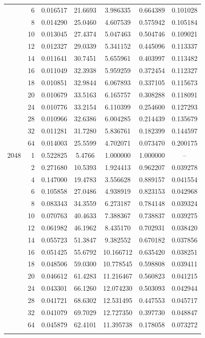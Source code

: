 \begin{longtable}{rrccccc}
 & 6 & 0.016517 & 21.6693 & 3.986335 & 0.664389 & 0.101028 \\
 & 8 & 0.014290 & 25.0460 & 4.607539 & 0.575942 & 0.105184 \\
 & 10 & 0.013045 & 27.4374 & 5.047463 & 0.504746 & 0.109021 \\
 & 12 & 0.012327 & 29.0339 & 5.341152 & 0.445096 & 0.113337 \\
 & 14 & 0.011641 & 30.7451 & 5.655961 & 0.403997 & 0.113482 \\
 & 16 & 0.011049 & 32.3938 & 5.959259 & 0.372454 & 0.112327 \\
 & 18 & 0.010851 & 32.9844 & 6.067893 & 0.337105 & 0.115673 \\
 & 20 & 0.010679 & 33.5163 & 6.165757 & 0.308288 & 0.118091 \\
 & 24 & 0.010776 & 33.2154 & 6.110399 & 0.254600 & 0.127293 \\
 & 28 & 0.010966 & 32.6386 & 6.004285 & 0.214439 & 0.135679 \\
 & 32 & 0.011281 & 31.7280 & 5.836761 & 0.182399 & 0.144597 \\
 & 64 & 0.014003 & 25.5599 & 4.702071 & 0.073470 & 0.200175 \\
2048 & 1 & 0.522825 & 5.4766 & 1.000000 & 1.000000 & -- \\
 & 2 & 0.271680 & 10.5393 & 1.924413 & 0.962207 & 0.039278 \\
 & 4 & 0.147000 & 19.4783 & 3.556628 & 0.889157 & 0.041554 \\
 & 6 & 0.105858 & 27.0486 & 4.938919 & 0.823153 & 0.042968 \\
 & 8 & 0.083343 & 34.3559 & 6.273187 & 0.784148 & 0.039324 \\
 & 10 & 0.070763 & 40.4633 & 7.388367 & 0.738837 & 0.039275 \\
 & 12 & 0.061982 & 46.1962 & 8.435170 & 0.702931 & 0.038420 \\
 & 14 & 0.055723 & 51.3847 & 9.382552 & 0.670182 & 0.037856 \\
 & 16 & 0.051425 & 55.6792 & 10.166712 & 0.635420 & 0.038251 \\
 & 18 & 0.048506 & 59.0300 & 10.778545 & 0.598808 & 0.039411 \\
 & 20 & 0.046612 & 61.4283 & 11.216467 & 0.560823 & 0.041215 \\
 & 24 & 0.043301 & 66.1260 & 12.074230 & 0.503093 & 0.042944 \\
 & 28 & 0.041721 & 68.6302 & 12.531495 & 0.447553 & 0.045717 \\
 & 32 & 0.041079 & 69.7029 & 12.727350 & 0.397730 & 0.048847 \\
 & 64 & 0.045879 & 62.4101 & 11.395738 & 0.178058 & 0.073272 \\
\bottomrule
\label{tab:v4_final_version_thread_scaling_extended}
\end{longtable}

